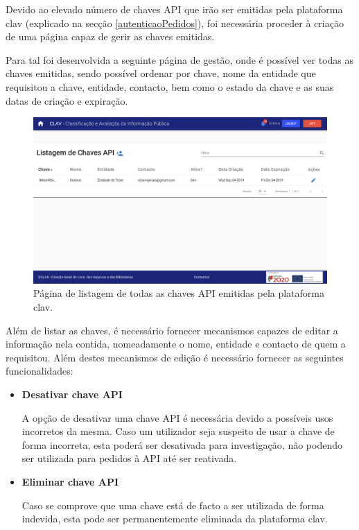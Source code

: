 Devido ao elevado número de chaves API que irão ser emitidas pela plataforma \gls{clav} (explicado na secção \ref{autenticaoPedidos}), foi necessária proceder à criação de uma página capaz de gerir as chaves emitidas.

Para tal foi desenvolvida a seguinte página de gestão, onde é possível ver todas as chaves emitidas, sendo possível ordenar por chave, nome da entidade que requisitou a chave, entidade, contacto, bem como o estado da chave e as suas datas de criação e expiração.

\begin{figure}[H]
    \centering
    \includegraphics[width=\textwidth]{img/clav/gestaoAPI/listagemChaves.png}
    \caption{Página de listagem de todas as chaves API emitidas pela plataforma \gls{clav}.}
    \label{fig:listagemChavesAPI}
\end{figure}

Além de listar as chaves, é necessário fornecer mecanismos capazes de editar a informação nela contida, nomeadamente o nome, entidade e contacto de quem a requisitou. Além destes mecanismos de edição é necessário fornecer as seguintes funcionalidades:

\begin{itemize}
    \item \textbf{Desativar chave API}
    
    A opção de desativar uma chave API é necessária devido a possíveis usos incorretos da mesma. Caso um utilizador seja suspeito de usar a chave de forma incorreta, esta poderá ser desativada para investigação, não podendo ser utilizada para pedidos à API até ser reativada.
    
    \item \textbf{Eliminar chave API}
    
    Caso se comprove que uma chave está de facto a ser utilizada de forma indevida, esta pode ser permanentemente eliminada da plataforma \gls{clav}.
\end{itemize}

